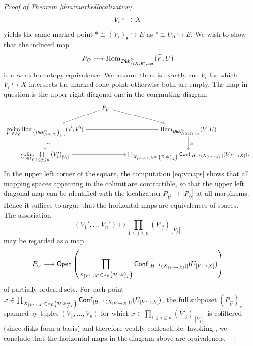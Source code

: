 \documentclass[10pt, reqno, twoside
, final
]{amsart}
\numberwithin{equation}{subsection}%
\theoremstyle{definition}
\theoremstyle{definition}
\theoremstyle{definition}
\theoremstyle{definition}
\theoremstyle{definition}
\theoremstyle{definition}
\theoremstyle{definition}
\theoremstyle{definition}
\theoremstyle{definition}
\theoremstyle{plain}
\theoremstyle{definition}
\theoremstyle{plain}
\theoremstyle{definition}
\theoremstyle{plain}
\theoremstyle{definition}
\theoremstyle{definition}
\theoremstyle{plain}
\theoremstyle{plain}
\theoremstyle{definition}
\theoremstyle{plain}
\theoremstyle{plain}
\theoremstyle{plain}
\begin{document}
\begin{proof}[Proof of Theorem \ref{thm:markedlocalization}]
\[ V_i\hooklongrightarrow X \]
yields the same marked point $*\cong (V_i)_0\hookrightarrow E$ as $*\cong U_0\hookrightarrow E$. We wish to show that the induced map 
\[ P_{\vec{V}} \longrightarrow \mathrm{Hom}_{\mathcal{D}\mathsf{isk}^{\otimes}_{/(X,E),\mathrm{act}}}(\vec{V},U) \]
is a weak homotopy equivalence. We assume there is exactly one $V_i$ for which $V_i\hookrightarrow X$ intersects the marked cone point; otherwise both \infcats are empty. The map in question is the upper right diagonal one in the commuting diagram
\[
\begin{tikzcd}
& P_{\vec{V}} \ar[dr] \ar[dl] \\
\underset{V'\in P_{\vec{V}}}{\colim}\Hom_{\left(\infdisk^{\otimes}_{/(X,E)}\right)_{\langle n\rangle}}(\vec{V},\vec{V'}) \ar[rr]\ar[d,"\simeq"] && \Hom_{\infdisk^{\otimes}_{/(X,E),\mathrm{act}}}(\vec{V},U) \ar[d,"\simeq"]\\
 \underset{V'\in P_{\vec{V}}}{\colim}\underset{1\leq j\leq n}{\prod} \left(V'_j\right)_{[V_j]} \ar[rr] &&   \prod_{X_{[V\hookrightarrow X]}\in\pi_0\left(\infdisk^{\simeq}_{/X}\right)} \mathsf{Conf}_{|H^{-1}(X_{[V\hookrightarrow X]})|}(U_{[V\hookrightarrow X]}).
\end{tikzcd}
\]
In the upper left corner of the square, the computation \eqref{eq:vmaps} shows that all mapping spaces appearing in the colimit are contractible, so that the upper left diagonal map can be identified with the localization $P_{\vec{V}}\rightarrow |P_{\vec{V}}|$ at all morphisms. Hence it suffices to argue that the horizontal maps are equivalences of spaces. The association 
\[ (V_1',\ldots,V_n')\longmapsto \underset{1\leq j\leq n}\prod \left(V'_j\right)_{[V_j]} \]
may be regarded as a map 
\[P_{\vec{V}}\longrightarrow \mathsf{Open}\left(\prod_{X_{[V\hookrightarrow X]}\in\pi_0\left(\mathcal{D}\mathsf{isk}^{\simeq}_{/X}\right)} \mathsf{Conf}_{|H^{-1}(X_{[V\hookrightarrow X]})|}(U_{[V\hookrightarrow X]})\right)\]
of partially ordered sets. For each point $x\in \prod_{X_{[V\hookrightarrow X]}\in\pi_0\left(\mathcal{D}\mathsf{isk}^{\simeq}_{/X}\right)} \mathsf{Conf}_{|H^{-1}(X_{[V\hookrightarrow X]})|}(U_{[V\hookrightarrow X]})$, the full subposet $(P_{\vec{V}})_x$ spanned by tuples $ (V_1,\ldots,V_n)$ for which $x\in \prod_{1\leq j\leq n}\left(V'_j\right)_{[V_j]}$ is cofiltered (since disks form a basis) and therefore weakly contractible. Invoking \cite[Theorem A.3.1]{LurHA}, we conclude that the horizontal maps in the diagram above are equivalences. 
\end{proof}
\end{document}
